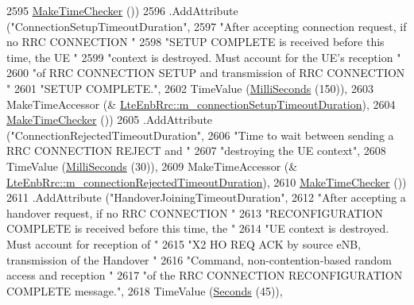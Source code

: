 \begin{DoxyCode}
2595                    \hyperlink{group__time_ga7032965bd4afa578691d88c09e4481c1}{MakeTimeChecker} ())
2596     .AddAttribute (\textcolor{stringliteral}{"ConnectionSetupTimeoutDuration"},
2597                    \textcolor{stringliteral}{"After accepting connection request, if no RRC CONNECTION "}
2598                    \textcolor{stringliteral}{"SETUP COMPLETE is received before this time, the UE "}
2599                    \textcolor{stringliteral}{"context is destroyed. Must account for the UE's reception "}
2600                    \textcolor{stringliteral}{"of RRC CONNECTION SETUP and transmission of RRC CONNECTION "}
2601                    \textcolor{stringliteral}{"SETUP COMPLETE."},
2602                    TimeValue (\hyperlink{group__timecivil_gaf26127cf4571146b83a92ee18679c7a9}{MilliSeconds} (150)), 
2603                    MakeTimeAccessor (&
      \hyperlink{classns3_1_1LteEnbRrc_a6709d1de2b719fa9722b7bdbf0e56176}{LteEnbRrc::m\_connectionSetupTimeoutDuration}),
2604                    \hyperlink{group__time_ga7032965bd4afa578691d88c09e4481c1}{MakeTimeChecker} ())
2605     .AddAttribute (\textcolor{stringliteral}{"ConnectionRejectedTimeoutDuration"},
2606                    \textcolor{stringliteral}{"Time to wait between sending a RRC CONNECTION REJECT and "}
2607                    \textcolor{stringliteral}{"destroying the UE context"},
2608                    TimeValue (\hyperlink{group__timecivil_gaf26127cf4571146b83a92ee18679c7a9}{MilliSeconds} (30)),
2609                    MakeTimeAccessor (&
      \hyperlink{classns3_1_1LteEnbRrc_a6624cf55251a24138828f010a42ab1ea}{LteEnbRrc::m\_connectionRejectedTimeoutDuration}),
2610                    \hyperlink{group__time_ga7032965bd4afa578691d88c09e4481c1}{MakeTimeChecker} ())
2611     .AddAttribute (\textcolor{stringliteral}{"HandoverJoiningTimeoutDuration"},
2612                    \textcolor{stringliteral}{"After accepting a handover request, if no RRC CONNECTION "}
2613                    \textcolor{stringliteral}{"RECONFIGURATION COMPLETE is received before this time, the "}
2614                    \textcolor{stringliteral}{"UE context is destroyed. Must account for reception of "}
2615                    \textcolor{stringliteral}{"X2 HO REQ ACK by source eNB, transmission of the Handover "}
2616                    \textcolor{stringliteral}{"Command, non-contention-based random access and reception "}
2617                    \textcolor{stringliteral}{"of the RRC CONNECTION RECONFIGURATION COMPLETE message."},
2618                    TimeValue (\hyperlink{group__timecivil_ga33c34b816f8ff6628e33d5c8e9713b9e}{Seconds} (45)),

\end{DoxyCode}
